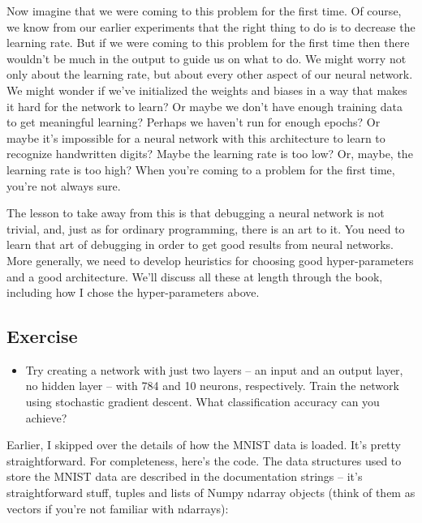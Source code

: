\documentclass[a4paper,twoside,10pt]{book}
\begin{document}
Now imagine that we were coming to this problem for the first time. Of course, we know from our earlier experiments that the right thing to do is to decrease the learning rate. But if we were coming to this problem for the first time then there wouldn't be much in the output to guide us on what to do. We might worry not only about the learning rate, but about every other aspect of our neural network. We might wonder if we've initialized the weights and biases in a way that makes it hard for the network to learn? Or maybe we don't have enough training data to get meaningful learning? Perhaps we haven't run for enough epochs? Or maybe it's impossible for a neural network with this architecture to learn to recognize handwritten digits? Maybe the learning rate is too low? Or, maybe, the learning rate is too high? When you're coming to a problem for the first time, you're not always sure.

The lesson to take away from this is that debugging a neural network is not trivial, and, just as for ordinary programming, there is an art to it. You need to learn that art of debugging in order to get good results from neural networks. More generally, we need to develop heuristics for choosing good hyper-parameters and a good architecture. We'll discuss all these at length through the book, including how I chose the hyper-parameters above.

\subsection*{Exercise}
\begin{itemize}
	\item Try creating a network with just two layers -- an input and an output layer, no hidden layer -- with 784 and 10 neurons, respectively. Train the network using stochastic gradient descent. What classification accuracy can you achieve?
\end{itemize}
Earlier, I skipped over the details of how the MNIST data is loaded. It's pretty straightforward. For completeness, here's the code. The data structures used to store the MNIST data are described in the documentation strings -- it's straightforward stuff, tuples and lists of Numpy ndarray objects (think of them as vectors if you're not familiar with ndarrays):
\end{document}
